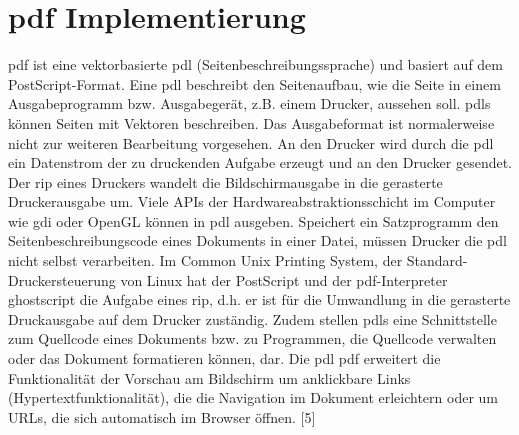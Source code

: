 \section{\gls{pdf} Implementierung}
\gls{pdf} ist eine vektorbasierte \gls{pdl} (Seitenbeschreibungssprache) und basiert auf dem PostScript-Format. Eine \gls{pdl} beschreibt den Seitenaufbau, wie die Seite in einem Ausgabeprogramm bzw. Ausgabegerät, z.B. einem Drucker, aussehen soll. \gls{pdl}s können Seiten mit Vektoren beschreiben. Das Ausgabeformat ist normalerweise nicht zur weiteren Bearbeitung vorgesehen. An den Drucker wird durch die \gls{pdl} ein Datenstrom der zu druckenden Aufgabe erzeugt und an den Drucker gesendet. Der \gls{rip} eines Druckers wandelt die Bildschirmausgabe in die gerasterte Druckerausgabe um. Viele APIs der Hardwareabstraktionsschicht im Computer wie \gls{gdi} oder OpenGL können in \gls{pdl} ausgeben. Speichert ein Satzprogramm den Seitenbeschreibungscode eines Dokuments in einer Datei, müssen Drucker die \gls{pdl} nicht selbst verarbeiten. Im Common Unix Printing System, der Standard-Druckersteuerung von Linux hat der PostScript und der \gls{pdf}-Interpreter ghostscript die Aufgabe eines \gls{rip}, d.h. er ist für die Umwandlung in die gerasterte Druckausgabe auf dem Drucker zuständig. Zudem stellen \gls{pdl}s eine Schnittstelle zum Quellcode eines Dokuments bzw. zu Programmen, die Quellcode verwalten oder das Dokument formatieren können, dar. Die \gls{pdl} \gls{pdf} erweitert die Funktionalität der Vorschau am Bildschirm um anklickbare Links (Hypertextfunktionalität), die die Navigation im Dokument erleichtern oder um URLs, die sich automatisch im Browser öffnen. [5]
\par
